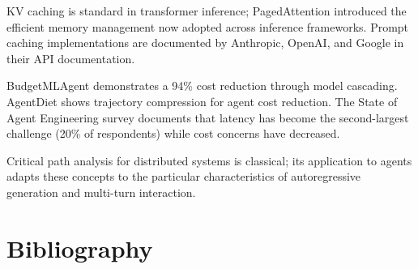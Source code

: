 \documentclass[11pt]{book}
\begin{document}
KV caching is standard in transformer inference; PagedAttention \cite{vllm2023} introduced the efficient memory management now adopted across inference frameworks. Prompt caching implementations are documented by Anthropic, OpenAI, and Google in their API documentation.

BudgetMLAgent \cite{budgetmlagent2024} demonstrates a 94\% cost reduction through model cascading. AgentDiet \cite{agentdiet2024} shows trajectory compression for agent cost reduction. The State of Agent Engineering survey \cite{stateofagent2025} documents that latency has become the second-largest challenge (20\% of respondents) while cost concerns have decreased.

Critical path analysis for distributed systems is classical; its application to agents adapts these concepts to the particular characteristics of autoregressive generation and multi-turn interaction.

\section*{Bibliography}
\end{document}

